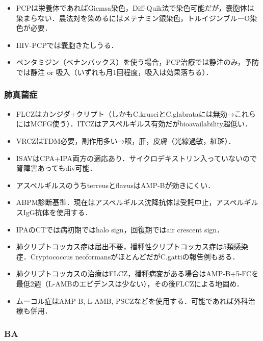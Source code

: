 \begin{itemize}
\item PCPは栄養体であればGiemsa染色，Diff-Quik法で染色可能だが，嚢胞体は染まらない．農法対を染めるにはメテナミン銀染色，トルイジンブルーO染色が必要．
\item HIV-PCPでは嚢胞きたしうる．
\item ペンタミジン（ベナンバックス）を使う場合，PCP治療では静注のみ，予防では静注 or 吸入（いずれも月1回程度，吸入は効果落ちる）．
\end{itemize}


\subsubsection{肺真菌症}

\begin{itemize}
\item FLCZはカンジダ+クリプト（しかもC.kruseiとC.glabrataには無効→これらにはMCFG使う）．ITCZはアスペルギルス有効だがbioavailability超低い．
\item VRCZはTDM必要，副作用多い→眼，肝，皮膚（光線過敏，紅斑）．
\item ISAVはCPA+IPA両方の適応あり．サイクロデキストリン入っていないので腎障害あってもdiv可能．
\item アスペルギルスのうちterreusとflavusはAMP-Bが効きにくい．
\item ABPM診断基準．現在はアスペルギルス沈降抗体は受託中止，アスペルギルスIgG抗体を使用する．


\item IPAのCTでは病初期ではhalo sign，回復期ではair crescent sign．
\item 肺クリプトコッカス症は届出不要，播種性クリプトコッカス症は5類感染症．Cryptococcus neoformansがほとんどだがC.gattiの報告例もある．
\item 肺クリプトコッカスの治療はFLCZ，播種病変がある場合はAMP-B+5-FCを最低2週（L-AMBのエビデンスは少ない），その後FLCZによる地固め．
\item ムーコル症はAMP-B, L-AMB, PSCZなどを使用する．可能であれば外科治療も併用．
\end{itemize}


\subsubsection{BA}

